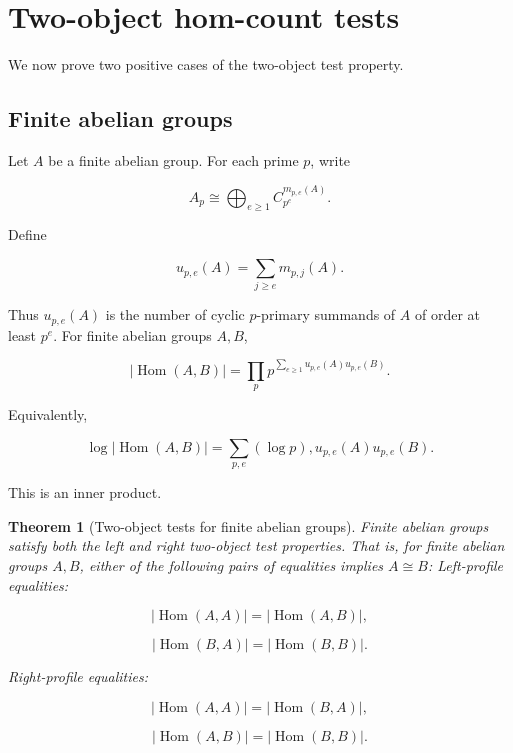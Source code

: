 \documentclass[11pt]{article}
\newtheorem{theorem}{Theorem}[section]
\begin{document}
\section{Two-object hom-count tests}

We now prove two positive cases of the two-object test property.

\subsection{Finite abelian groups}

Let $A$ be a finite abelian group. For each prime $p$, write

\[
A_p\cong\bigoplus_{e\ge1}C_{p^e}^{m_{p,e}(A)}.
\]

Define

\[
u_{p,e}(A)=\sum_{j\ge e}m_{p,j}(A).
\]

Thus $u_{p,e}(A)$ is the number of cyclic $p$-primary summands of $A$ of order at least $p^e$. For finite abelian groups $A,B$,

\[
|\operatorname{Hom}(A,B)|
=\prod_p
p^{\sum_{e\ge1}u_{p,e}(A)u_{p,e}(B)}.
\]

Equivalently,

\[
\log|\operatorname{Hom}(A,B)|
=\sum_{p,e}
(\log p),u_{p,e}(A)u_{p,e}(B).
\]

This is an inner product.

\begin{theorem}[Two-object tests for finite abelian groups]
Finite abelian groups satisfy both the left and right two-object test properties. That is, for finite abelian groups $A,B$, either of the following pairs of equalities implies $A\cong B$: Left-profile equalities:

\[
|\operatorname{Hom}(A,A)|
=|\operatorname{Hom}(A,B)|,
\]

\[
|\operatorname{Hom}(B,A)|
=|\operatorname{Hom}(B,B)|.
\]

Right-profile equalities:

\[
|\operatorname{Hom}(A,A)|
=|\operatorname{Hom}(B,A)|,
\]

\[
|\operatorname{Hom}(A,B)|
=|\operatorname{Hom}(B,B)|.
\]

\end{theorem}
\end{document}
